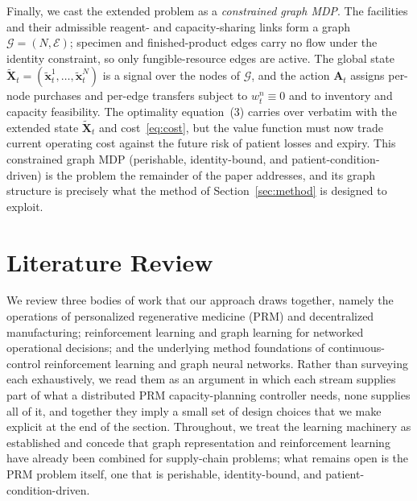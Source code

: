 \documentclass[preprint,review,12pt,nonatbib]{elsarticle}
\providecommand{\DIFadd}[1]{{\protect\color{blue}#1}} %
\providecommand{\DIFaddbegin}{} %
\providecommand{\DIFaddend}{} %
\providecommand{\DIFaddincludegraphics}[2][]{{\color{blue}\fbox{\DIFOincludegraphics[#1]{#2}}}} %
\DeclareRobustCommand{\DIFaddbegin}{\DIFOaddbegin \let\includegraphics\DIFaddincludegraphics} %
\DeclareRobustCommand{\DIFaddend}{\DIFOaddend \let\includegraphics\DIFOincludegraphics} %
\begin{document}
\DIFadd{Finally, we cast the extended problem as a }\emph{\DIFadd{constrained graph MDP}}\DIFadd{. The facilities and their admissible reagent- and capacity-sharing links form a graph $\mathcal{G}=(N,\mathcal{E})$; specimen and finished-product edges carry no flow under the identity constraint, so only fungible-resource edges are active. The global state $\tilde{\mathbf{X}}_t=(\tilde{\mathbf{x}}^1_t,\ldots,\tilde{\mathbf{x}}^N_t)$ is a signal over the nodes of $\mathcal{G}$, and the action $\mathbf{A}_t$ assigns per-node purchases and per-edge transfers subject to $w^n_t\equiv 0$ and to inventory and capacity feasibility. The optimality equation~(3) carries over verbatim with the extended state $\tilde{\mathbf{X}}_t$ and cost~\eqref{eq:cost}, but the value function must now trade current operating cost against the future risk of patient losses and expiry. This constrained graph MDP (perishable, identity-bound, and patient-condition-driven) is the problem the remainder of the paper addresses, and its graph structure is precisely what the method of Section~\ref{sec:method} is designed to exploit.
}


\DIFaddend \section{Literature Review}
\label{sec:literature}

\DIFaddbegin \DIFadd{We review three bodies of work that our approach draws together, namely the operations of personalized regenerative medicine (PRM) and decentralized manufacturing; reinforcement learning and graph learning for networked operational decisions; and the underlying method foundations of continuous-control reinforcement learning and graph neural networks. Rather than surveying each exhaustively, we read them as an argument in which each stream supplies part of what a distributed PRM capacity-planning controller needs, none supplies all of it, and together they imply a small set of design choices that we make explicit at the end of the section. Throughout, we treat the learning machinery as established and concede that graph representation and reinforcement learning have already been combined for supply-chain problems; what remains open is the PRM problem itself, one that is perishable, identity-bound, and patient-condition-driven.
}
\end{document}

